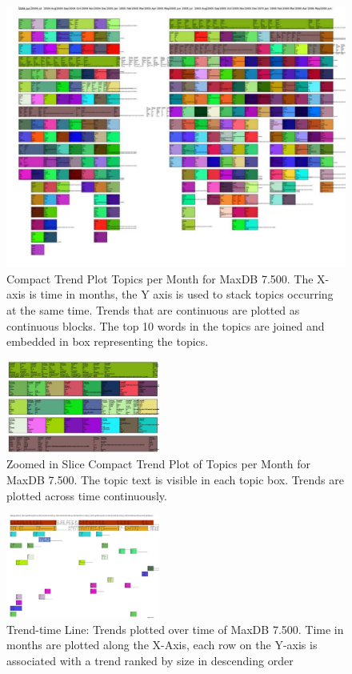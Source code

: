 \documentclass[times, 10pt,twocolumn]{article}
\begin{document}
\begin{figure}
  \centering
  \includegraphics[width=1.0\textwidth]{fixed-time-smear-plot-scaled}
  \caption{Compact Trend Plot Topics per Month for MaxDB 7.500. The
    X-axis is time in months, the Y axis is used to stack topics
    occurring at the same time. Trends that are continuous are
    plotted as continuous blocks. The top 10 words in the topics are
    joined and embedded in box representing the topics.}
  \label{fig:topicsmear}
\end{figure}


\begin{figure}
  \centering
  \includegraphics[width=0.45\textwidth]{fixed-time-smear-plot-cropped}
  \caption{Zoomed in Slice Compact Trend Plot of Topics per Month for MaxDB 7.500. The topic text is visible in each topic box. Trends are plotted across time continuously.}
  \label{fig:zoomedsmear}
\end{figure}


\begin{figure}
  \centering
  \includegraphics[width=0.45\textwidth]{class-smear-plot-crop-scaled}
  \caption{Trend-time Line: Trends plotted over time of MaxDB 7.500. Time in months are plotted along the X-Axis, each row on the Y-axis is associated with a trend ranked by size in descending order}         
  \label{fig:trendtimeline}
\end{figure}
\end{document}
